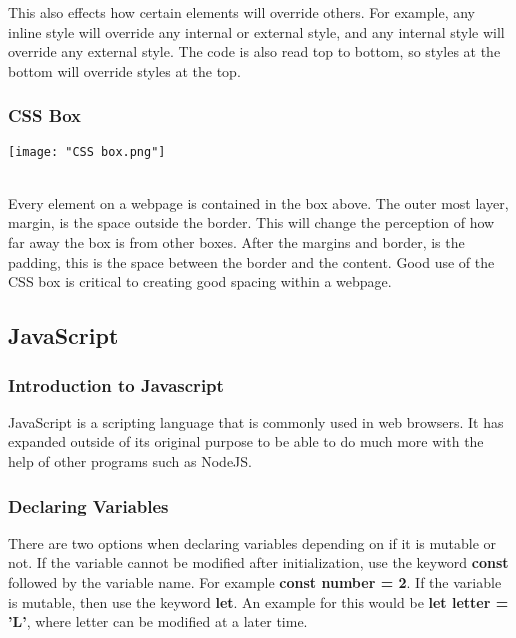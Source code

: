 \documentclass[portfolio.tex]{subfiles}
\begin{document}
					This also effects how certain elements will override others. For example, any inline style will override any internal or external style, and any internal style will override any external style. The code is also read top to bottom, so styles at the bottom will override styles at the top.

				\subsubsection{CSS Box}

					\begin{center}
						\texttt{[image: "CSS box.png"]}\\
						\autocite{w3-box}\\
					\end{center}

					Every element on a webpage is contained in the box above. The outer most layer, margin, is the space outside the border. This will change the perception of how far away the box is from other boxes. After the margins and border, is the padding, this is the space between the border and the content. Good use of the CSS box is critical to creating good spacing within a webpage.

			\subsection{JavaScript}
				\label{week-1-js}
				\bigskip
				\subsubsection{Introduction to Javascript}
					JavaScript is a scripting language that is commonly used in web browsers. It has expanded outside of its original purpose to be able to do much more with the help of other programs such as NodeJS.\\

				\subsubsection{Declaring Variables}
					There are two options when declaring variables depending on if it is mutable or not. If the variable cannot be modified after initialization, use the keyword \textbf{const} followed by the variable name. For example \textbf{const number = 2}. If the variable is mutable, then use the keyword \textbf{let}. An example for this would be \textbf{let letter = 'L'}, where letter can be modified at a later time.
\end{document}
